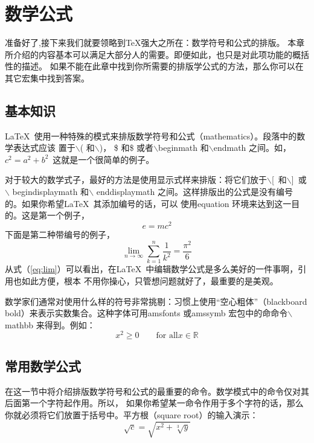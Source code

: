 
\chapter{数学公式}
\label{chap:math}
准备好了,接下来我们就要领略到\TeX 强大之所在：数学符号和公式的排版。
本章所介绍的内容基本可以满足大部分人的需要。即便如此，也只是对此项功能的概括性的描述。
如果不能在此章中找到你所需要的排版学公式的方法，那么你可以在其它宏集中找到答案\cite{lshort-cn}。

\section{基本知识}
\LaTeX{}~使用一种特殊的模式来排版数学符号和公式（mathematics）。段落中的数学表达式应该
置于$\backslash$( 和$\backslash$)， \$ 和\$ 或者$\backslash$begin{math} 和$\backslash$end{math} 之间。如，$c^2=a^2+b^2$~这就是一个很简单的例子。

对于较大的数学式子，最好的方法是使用显示式样来排版：将它们放于$\backslash$[~和$\backslash$]~或$\backslash$ begin{displaymath} 和$\backslash$ end{displaymath} 之间。这样排版出的公式是没有编号的。如果你希望\LaTeX{}~其添加编号的话，可以
使用equation 环境来达到这一目的。这是第一个例子，
\begin{displaymath}
e=mc^2
\end{displaymath}
下面是第二种带编号的例子，
\begin{equation}\label{eq:lim}
    \lim_{n \to \infty} \sum_{k=1}^n \frac{1}{k^2} = \frac{\pi^2}{6}
\end{equation}
从式（\ref{eq:lim}）可以看出，在\LaTeX{}~中编辑数学公式是多么美好的一件事啊，引用也如此方便，根本
不用你操心，只管想问题就好了，最重要的是美观。

数学家们通常对使用什么样的符号非常挑剔：习惯上使用“空心粗体”（blackboard bold）来表示实数集合。这种字体可用amsfonts 或amssymb 宏包中的命命令$\backslash$mathbb
来得到。例如：
\begin{equation}\label{eq:sum}
x^2 \geq 0 \qquad \textrm{for all} x \in \mathbb{R}
\end{equation}

\section{常用数学公式}
在这一节中将介绍排版数学符号和公式的最重要的命令。数学模式中的命令仅对其后面第一个字符起作用。所以，
如果你希望某一命令作用于多个字符的话，那么你就必须将它们放置于括号中。平方根（square root）的输入演示：
\begin{equation}\label{eq:sq}
    \sqrt{c} = \sqrt{x^2+\sqrt[3]{y}}
\end{equation}


